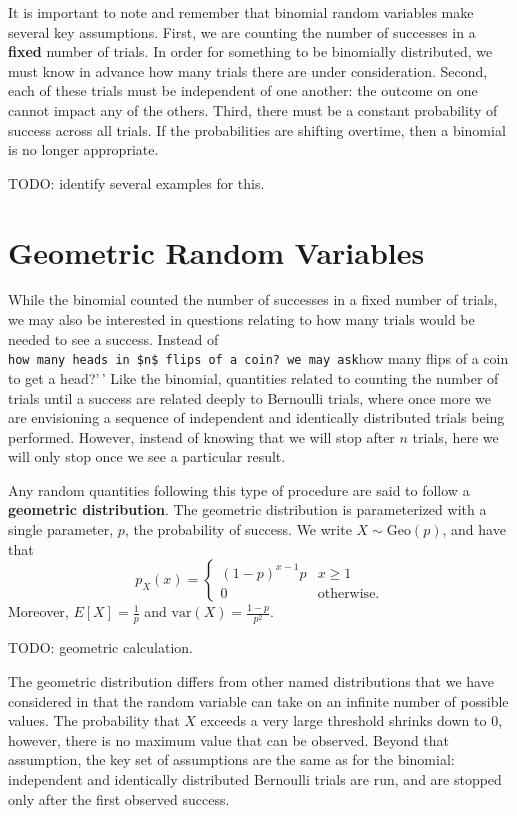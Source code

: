\documentclass[
  letterpaper,
  DIV=11,
  numbers=noendperiod]{scrreprt}
\begin{document}
It is important to note and remember that binomial random variables make
several key assumptions. First, we are counting the number of successes
in a \textbf{fixed} number of trials. In order for something to be
binomially distributed, we must know in advance how many trials there
are under consideration. Second, each of these trials must be
independent of one another: the outcome on one cannot impact any of the
others. Third, there must be a constant probability of success across
all trials. If the probabilities are shifting overtime, then a binomial
is no longer appropriate.

TODO: identify several examples for this.

\section{Geometric Random Variables}\label{geometric-random-variables}

While the binomial counted the number of successes in a fixed number of
trials, we may also be interested in questions relating to how many
trials would be needed to see a success. Instead of
\texttt{how\ many\ heads\ in\ \$n\$\ flips\ of\ a\ coin?\textquotesingle{}\textquotesingle{}\ we\ may\ ask}how
many flips of a coin to get a head?'\,' Like the binomial, quantities
related to counting the number of trials until a success are related
deeply to Bernoulli trials, where once more we are envisioning a
sequence of independent and identically distributed trials being
performed. However, instead of knowing that we will stop after \(n\)
trials, here we will only stop once we see a particular result.

Any random quantities following this type of procedure are said to
follow a \textbf{geometric distribution}. The geometric distribution is
parameterized with a single parameter, \(p\), the probability of
success. We write \(X\sim\text{Geo}(p)\), and have that \[
p_X(x) = \begin{cases}(1-p)^{x-1}p & x \geq 1 \\ 
0 & \text{otherwise}.\end{cases}\] Moreover, \(E[X] = \frac{1}{p}\) and
\(\text{var}(X) = \frac{1-p}{p^2}\).

TODO: geometric calculation.

The geometric distribution differs from other named distributions that
we have considered in that the random variable can take on an infinite
number of possible values. The probability that \(X\) exceeds a very
large threshold shrinks down to \(0\), however, there is no maximum
value that can be observed. Beyond that assumption, the key set of
assumptions are the same as for the binomial: independent and
identically distributed Bernoulli trials are run, and are stopped only
after the first observed success.
\end{document}

